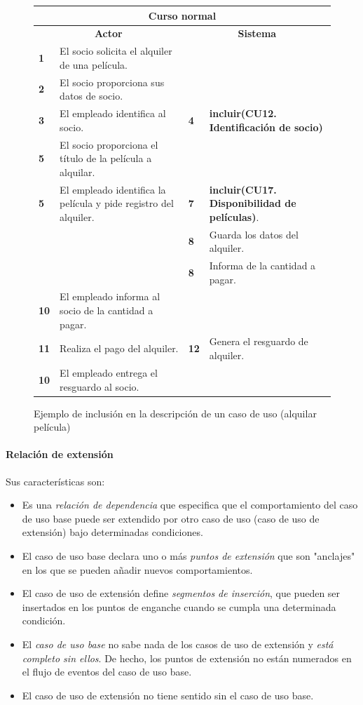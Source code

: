 \documentclass[12pt,spanish]{article}
\begin{document}
\begin{figure}[H]
\centering
\begin{tabular}{|m{10pt}|m{7cm}|m{10pt}|m{7cm}|}
\hline
\multicolumn{4}{|c|}{\textbf{Curso normal}} \\
\hline
\multicolumn{2}{|c}{\textbf{Actor}} & \multicolumn{2}{|c|}{\textbf{Sistema}} \\
\hline
\textbf{1} & El socio solicita el alquiler de una película. &  & \\
\hline
\textbf{2} & El socio proporciona sus datos de socio. &  &  \\
\hline
\textbf{3} & El empleado identifica al socio. & \textbf{4} & \textbf{incluir(CU12. Identificación de socio)} \\
\hline
\textbf{5} & El socio proporciona el título de la película a alquilar. &  &  \\
\hline
\textbf{5} & El empleado identifica la película y pide registro del alquiler. & \textbf{7} & \textbf{incluir(CU17. Disponibilidad de películas)}. \\
\hline
 & & \textbf{8} & Guarda los datos del alquiler.  \\
\hline
 & & \textbf{8} & Informa de la cantidad a pagar.  \\
\hline
\textbf{10} & El empleado informa al socio de la cantidad a pagar. &  &  \\
\hline
\textbf{11} & Realiza el pago del alquiler. & \textbf{12} & Genera el resguardo de alquiler. \\
\hline
\textbf{10} & El empleado entrega el resguardo al socio. &  &  \\
\hline
\end{tabular}
\caption{Ejemplo de inclusión en la descripción de un caso de uso (alquilar película)}
\end{figure}

\paragraph{Relación de extensión}

Sus características son:

\begin{itemize}
	\item Es una \emph{relación de dependencia} que especifica que el comportamiento del caso de uso base puede ser extendido por otro caso de uso (caso de uso de extensión) bajo determinadas condiciones.
	\item El caso de uso base declara uno o más \emph{puntos de extensión} que son "anclajes" en los que se pueden añadir nuevos comportamientos.
	\item El caso de uso de extensión define \emph{segmentos de inserción}, que pueden ser insertados en los puntos de enganche cuando se cumpla una determinada condición.
	\item El \emph{caso de uso base} no sabe nada de los casos de uso de extensión y \emph{está completo sin ellos}. De hecho, los puntos de extensión no están numerados en el flujo de eventos del caso de uso base.
	\item El caso de uso de extensión no tiene sentido sin el caso de uso base.
\end{itemize}
\end{document}
